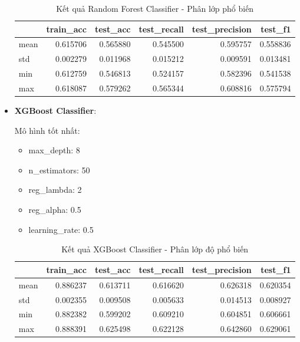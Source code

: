 \begin{itemize}
            \begin{table}[htbp]
                \centering
                \caption{Kết quả Random Forest Classifier - Phân lớp phổ biến}
                \label{tab:mal-member-RF}
                \begin{tabular}{lrrrrr}
                    \hline
                     & train\_acc & test\_acc & test\_recall & test\_precision & test\_f1 \\
                    \hline
                        mean & 0.615706 & 0.565880 & 0.545500 & 0.595757 & 0.558836 \\
                        std & 0.002279 & 0.011968 & 0.015212 & 0.009591 & 0.013481 \\
                        min & 0.612759 & 0.546813 & 0.524157 & 0.582396 & 0.541538 \\
                        max & 0.618087 & 0.579262 & 0.565344 & 0.608816 & 0.575794 \\
                    \hline
                \end{tabular}
            \end{table}
            
            \FloatBarrier

        \item \textbf{XGBoost Classifier}:
        
            Mô hình tốt nhất:
            \begin{itemize}
                \item max\_depth: 8
                \item n\_estimators: 50
                \item reg\_lambda: 2
                \item reg\_alpha: 0.5
                \item learning\_rate: 0.5
            \end{itemize}

            \begin{table}[htbp]
                \centering
                \caption{Kết quả XGBoost Classifier - Phân lớp độ phổ biến}
                \label{tab:mal-member-XGBC}
                \begin{tabular}{lrrrrr}
                \hline
                 & train\_acc & test\_acc & test\_recall & test\_precision & test\_f1  \\
                \hline
                mean & 0.886237 & 0.613711 & 0.616620 & 0.626318 & 0.620354 \\
                std & 0.002355 & 0.009508 & 0.005633 & 0.014513 & 0.008927 \\
                min & 0.882382 & 0.599202 & 0.609210 & 0.604851 & 0.606661 \\
                max & 0.888391 & 0.625498 & 0.622128 & 0.642860 & 0.629061 \\
                \hline
                \end{tabular}
            \end{table}

            \FloatBarrier
    \end{itemize}

